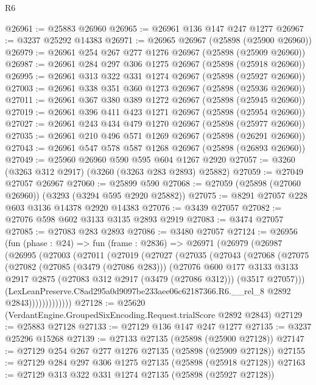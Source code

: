 \begin{lexlean}{R6}
\begin{coremodule}
@26961 := @25883 @26960
@26965 := @26961 @136 @147 @247 @1277
@26967 := @3237 @25292 @14383
@26971 := @26965 @26967 (@25898 (@25900 @26960))
@26979 := @26961 @254 @267 @277 @1276 @26967 (@25898 (@25909 @26960))
@26987 := @26961 @284 @297 @306 @1275 @26967 (@25898 (@25918 @26960))
@26995 := @26961 @313 @322 @331 @1274 @26967 (@25898 (@25927 @26960))
@27003 := @26961 @338 @351 @360 @1273 @26967 (@25898 (@25936 @26960))
@27011 := @26961 @367 @380 @389 @1272 @26967 (@25898 (@25945 @26960))
@27019 := @26961 @396 @411 @423 @1271 @26967 (@25898 (@25954 @26960))
@27027 := @26961 @243 @434 @479 @1270 @26967 (@25898 (@25977 @26960))
@27035 := @26961 @210 @496 @571 @1269 @26967 (@25898 (@26291 @26960))
@27043 := @26961 @547 @578 @587 @1268 @26967 (@25898 (@26893 @26960))
@27049 := @25960 @26960 @590 @595 @604 @1267 @2920
@27057 := @3260 (@3263 @312 @2917) (@3260 (@3263 @283 @2893) @25882)
@27059 := @27049 @27057 @26967
@27060 := @25899 @590
@27068 := @27059 (@25898 (@27060 @26960)) (@3293 (@3294 @595 @2920 @25882))
@27075 := @8291 @27057 @228 @603 @3136 @14378 @2920 @14383
@27076 := @3439 @27057
@27082 := @27076 @598 @602 @3133 @3135 @2893 @2919
@27083 := @3474 @27057
@27085 := @27083 @283 @2893
@27086 := @3480 @27057
@27124 := @26956
    (fun (phase : @24) =>
    fun (frame : @2836) =>
    @26971
      (@26979
        (@26987
          (@26995
            (@27003
              (@27011
                (@27019
                  (@27027
                    (@27035
                      (@27043
                        (@27068
                          (@27075
                            (@27082
                              (@27085 (@3479 (@27086 @283)))
                              (@27076
                                @600
                                @177
                                @3133
                                @3133
                                @2917
                                @2875
                                (@27083 @312 @2917 (@3479 (@27086 @312)))
                                (@3517 @27057)))
                            (LexLeanPreserve.C8ad295a0d9097be233aee06c62187366.R6.__rel_8
                              @2892
                              @2843)))))))))))))
@27128 := @25620 (VerdantEngine.GroupedSixEncoding.Request.trialScore @2892 @2843)
@27129 := @25883 @27128
@27133 := @27129 @136 @147 @247 @1277
@27135 := @3237 @25296 @15268
@27139 := @27133 @27135 (@25898 (@25900 @27128))
@27147 := @27129 @254 @267 @277 @1276 @27135 (@25898 (@25909 @27128))
@27155 := @27129 @284 @297 @306 @1275 @27135 (@25898 (@25918 @27128))
@27163 := @27129 @313 @322 @331 @1274 @27135 (@25898 (@25927 @27128))

\end{coremodule}
\end{lexlean}
